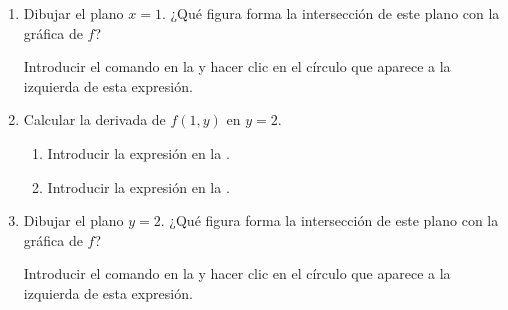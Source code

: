 \begin{enumerate}[leftmargin=*]
\begin{enumerate}
\begin{indication}
            \end{indication}


      \item Dibujar el plano $x=1$. ¿Qué figura forma la intersección de este plano con la gráfica de $f$?
            \begin{indication}
            Introducir el comando  en la  y hacer clic en el círculo que aparece a la izquierda de esta expresión.
            \end{indication}

      \item Calcular la derivada de $f(1,y)$ en $y=2$.
            \begin{indication}
            \begin{enumerate}
            \item Introducir la expresión  en la .
            \item Introducir la expresión  en la .
            \end{enumerate}
            \end{indication}

      \item Dibujar el plano $y=2$. ¿Qué figura forma la intersección de este plano con la gráfica de $f$?
            \begin{indication}
            Introducir el comando  en la  y hacer clic en el círculo que aparece a la izquierda de esta expresión.
            \end{indication}


\end{enumerate}
\end{enumerate}
